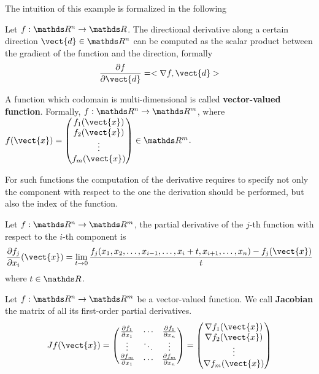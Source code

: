 \documentclass[computationalMathematics.tex]{subfiles}
\begin{document}
\noindent The intuition of this example is formalized in the following

\begin{proposition}
Let $f: \R^n \to \R$. 
The directional derivative along a certain direction $\vect{d} \in \R^n$ can be computed as the scalar product between the gradient of the function and the direction, formally
\[
\frac{\partial f}{\partial \vect{d}} = \ps{\nabla f}{ \vect{d}}
\]
\end{proposition}

\begin{definition}
  A function which codomain is multi-dimensional is called \textbf{vector-valued function}.
  Formally, $f: \R^n \to \R^m$, where $f(\vect{x}) =  \begin{pmatrix} f_1(\vect{x})\\f_2(\vect{x})\\ \vdots\\ f_m(\vect{x})\end{pmatrix} \in \R^m$.
\end{definition}

For such functions the computation of the derivative requires to specify not only the component with respect to the one the derivation should be performed, but also the index of the function.

\begin{definition}
Let $f: \R^n \to \R^m$, the partial derivative of the $j$-th function with respect to the $i$-th component is
\[
   \frac{\partial f_{j}}{\partial x_i}(\vect{x}) =
   \lim_{t \to 0} \frac{f_{j}(x_1, x_2, \ldots, x_{i-1}, \ldots, x_i + t, x_{i+1}, \ldots, x_n) - f_{j}(\vect{x})}{t}
\]
where $t \in \R$.
\end{definition}

\begin{definition}[Jacobian]
  Let $f: \R^n \to \R^m$ be a vector-valued function. 
  We call \textbf{Jacobian} the matrix of all its first-order partial derivatives.
\[
  Jf(\vect{x}) =
  \begin{pmatrix}
    \frac{\partial f_1}{\partial x_1} & \cdots & \frac{\partial f_1}{\partial x_n}\\
    \vdots & \ddots & \vdots\\
    \frac{\partial f_m}{\partial x_1} & \cdots & \frac{\partial f_m}{\partial x_n}\\
  \end{pmatrix}
  =
  \begin{pmatrix}
    \nabla f_1(\vect{x})\\
    \nabla f_2(\vect{x})\\
    \vdots\\
    \nabla f_m(\vect{x})
  \end{pmatrix}
\]
\end{definition}
\end{document}

